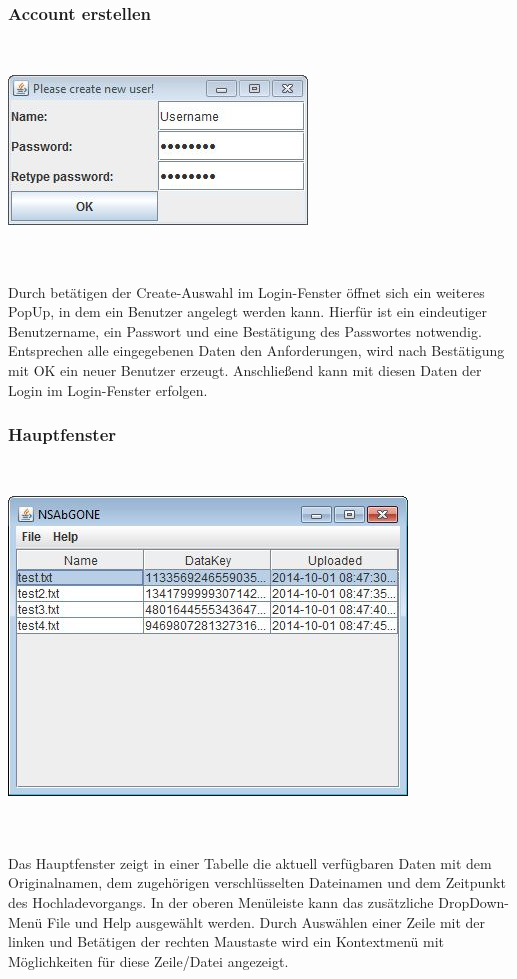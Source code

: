 \documentclass[13pt,a4paper,bibliography=totocnumbered,listof=totocnumbered]{scrartcl}
\begin{document}
\subsubsection{Account erstellen}
$\;$\\
\begin{minipage}{\linewidth}
	\centering
	\includegraphics[width=0.4\linewidth]{./img/Create.jpg}
	\label{Create}
\end{minipage}
\\\\Durch betätigen der Create-Auswahl im Login-Fenster öffnet sich ein weiteres PopUp, in dem ein Benutzer angelegt werden kann. Hierfür ist ein eindeutiger Benutzername, ein Passwort und eine Bestätigung des Passwortes notwendig. Entsprechen alle eingegebenen Daten den Anforderungen, wird nach Bestätigung mit OK ein neuer Benutzer erzeugt. Anschließend kann mit diesen Daten der Login im Login-Fenster erfolgen.

\subsubsection{Hauptfenster}
$\;$\\
\begin{minipage}{\linewidth}
	\centering
	\includegraphics[width=0.4\linewidth]{./img/Main.jpg}
	\label{Main}
\end{minipage}
\\\\Das Hauptfenster zeigt in einer Tabelle die aktuell verfügbaren Daten mit dem Originalnamen, dem zugehörigen verschlüsselten Dateinamen und dem Zeitpunkt des Hochladevorgangs. In der oberen Menüleiste kann das zusätzliche DropDown-Menü File und Help ausgewählt werden. Durch Auswählen einer Zeile mit der linken und Betätigen der rechten Maustaste wird ein Kontextmenü mit Möglichkeiten für diese Zeile/Datei angezeigt.
\end{document}
